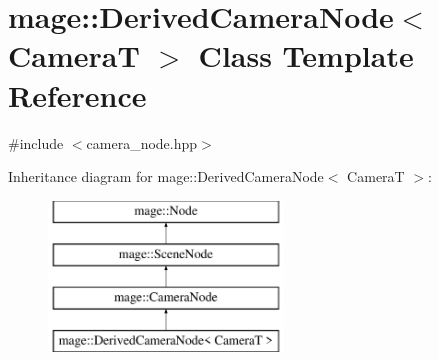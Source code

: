 \hypertarget{classmage_1_1_derived_camera_node}{}\section{mage\+:\+:Derived\+Camera\+Node$<$ CameraT $>$ Class Template Reference}
\label{classmage_1_1_derived_camera_node}


{\ttfamily \#include $<$camera\+\_\+node.\+hpp$>$}

Inheritance diagram for mage\+:\+:Derived\+Camera\+Node$<$ CameraT $>$\+:\begin{figure}[H]
\begin{center}
\leavevmode
\includegraphics[height=4.000000cm]{classmage_1_1_derived_camera_node}
\end{center}
\end{figure}
